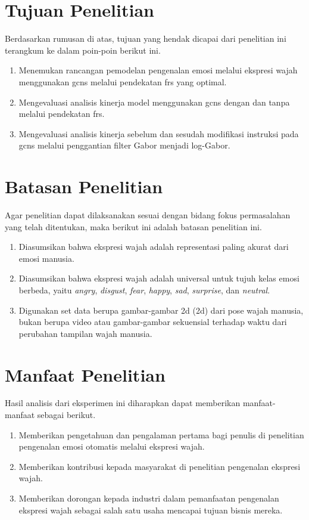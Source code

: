 \section{Tujuan Penelitian}
Berdasarkan rumusan di atas, tujuan yang hendak dicapai dari penelitian ini terangkum ke dalam poin-poin berikut ini.
\begin{enumerate}
    \item Menemukan rancangan pemodelan pengenalan emosi melalui ekspresi wajah menggunakan \acrshort{gcns} melalui pendekatan \acrshort{frs} yang optimal.
    \item Mengevaluasi analisis kinerja model menggunakan \acrshort{gcns} dengan dan tanpa melalui pendekatan \acrshort{frs}.
    \item Mengevaluasi analisis kinerja sebelum dan sesudah modifikasi instruksi pada \acrshort{gcns} melalui penggantian filter Gabor menjadi log-Gabor.
\end{enumerate}

\section{Batasan Penelitian}
Agar penelitian dapat dilaksanakan sesuai dengan bidang fokus permasalahan yang telah ditentukan, maka berikut ini adalah batasan penelitian ini.
\begin{enumerate}
    \item Diasumsikan bahwa ekspresi wajah adalah representasi paling akurat dari emosi manusia.
    \item Diasumsikan bahwa ekspresi wajah adalah universal untuk tujuh kelas emosi berbeda, yaitu \textit{angry}, \textit{disgust}, \textit{fear}, \textit{happy}, \textit{sad}, \textit{surprise}, dan \textit{neutral}.
    \item Digunakan set data berupa gambar-gambar \acrlong{2d} (\acrshort{2d}) dari pose wajah manusia, bukan berupa video atau gambar-gambar sekuensial terhadap waktu dari perubahan tampilan wajah manusia.
\end{enumerate}

\section{Manfaat Penelitian}
Hasil analisis dari eksperimen ini diharapkan dapat memberikan manfaat-manfaat sebagai berikut.
\begin{enumerate}
    \item Memberikan pengetahuan dan pengalaman pertama bagi penulis di penelitian pengenalan emosi otomatis melalui ekspresi wajah.
    \item Memberikan kontribusi kepada masyarakat di penelitian pengenalan ekspresi wajah.
    \item Memberikan dorongan kepada industri dalam pemanfaatan pengenalan ekspresi wajah sebagai salah satu usaha mencapai tujuan bisnis mereka.
\end{enumerate}

